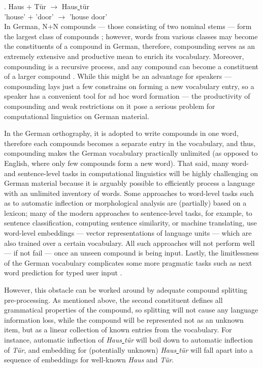 \documentclass[11pt]{article}
\begin{document}
\exg. \label{ex1}Haus + T{\"u}r {$\rightarrow$} Haus\underline{ }t{\"u}r \\
'house' + 'door' {$\rightarrow$} {'house door'} \\

In German, N+N compounds --- those consisting of two nominal stems --- form the largest class of compounds \cite{Schlucker2022}; however, words from various classes may become the constituents of a compound in German, therefore, compounding serves as an extremely extensive and productive mean to enrich its vocabulary. Moreover, compounding is a recursive process, and any compound can become a constituent of a larger compound \cite[226]{Schafer2018:a}. While this might be an advantage for speakers --- compounding lays just a few constrains on forming a new vocabulary entry, so a speaker has a convenient tool for ad hoc word formation --- the productivity of compounding and weak restrictions on it pose a serious problem for computational linguistics on German material.

In the German orthography, it is adopted to write compounds in one word, therefore each compounds becomes a separate entry in the vocabulary, and thus, compounding makes the German vocabulary practically unlimited (as opposed to English, where only few compounds form a new word). That said, many word- and sentence-level tasks in computational linguistics will be highly challenging on German material because it is arguably possible to efficiently process a language with an unlimited inventory of words. Some approaches to word-level tasks such as to automatic inflection or morphological analysis are (partially) based on a lexicon; many of the modern approaches to sentence-level tasks, for example, to sentence classification, computing sentence similarity, or machine translating, use word-level embeddings --- vector representations of language units --- which are also trained over a certain vocabulary. All such approaches will not perform well --- if not fail --- once an unseen compound is being input. Lastly, the limitlessness of the German vocabulary complicates some more pragmatic tasks such as next word prediction for typed user input \cite{baroni:2003}.

However, this obstacle can be worked around by adequate compound splitting pre-processing. As mentioned above, the second constituent defines all grammatical properties of the compound, so splitting will not cause any language information loss, while the compound will be represented not as an unknown item, but as a linear collection of known entries from the vocabulary. For instance, automatic inflection of \textit{Haus\underline{ }t{\"u}r} will boil down to automatic inflection of \textit{T{\"u}r}, and embedding for (potentially unknown) \textit{Haus\underline{ }t{\"u}r} will fall apart into a sequence of embeddings for well-known \textit{Haus} and \textit{T{\"u}r}.
\end{document}
